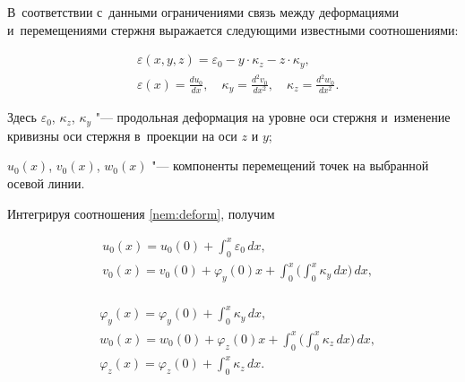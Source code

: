 В~соответствии с~данными ограничениями связь между деформациями и~перемещениями стержня выражается следующими известными соотношениями:

\begin{equation}\label{nem:deform}

\begin{aligned}

&\varepsilon(x,y,z)=\varepsilon_0-y\cdot\kappa_z-z\cdot\kappa_y,\\

&\varepsilon(x)=\frac{du_0}{dx},\quad \kappa_y=\frac{d^2v_0}{dx^2}, \quad \kappa_z=\frac{d^2w_0}{dx^2}.

\end{aligned}

\end{equation}

Здесь $\varepsilon_0$, $\kappa_z$, $\kappa_y$ "---  продольная деформация на уровне оси стержня и~изменение кривизны оси стержня в~проекции на оси $z$ и $y$; 

$u_0(x)$, $v_0(x)$, $w_0(x)$ "---  компоненты перемещений точек на выбранной осевой линии. 

Интегрируя соотношения \eqref{nem:deform}, получим

\begin{equation}

\begin{aligned}

&u_0(x)=u_0(0)+\int _0^x \varepsilon_0\,dx,\\

&v_0(x)=v_0(0)+\varphi_y(0) x+\int _0^x\biggl(\int _0^x \kappa_y\,dx\biggr)\,dx,\\

\end{aligned}

\end{equation}

\begin{equation}

\begin{aligned}

& \varphi_y(x)=\varphi_y(0)+\int _0^x \kappa_y\,dx,\\

&w_0(x)=w_0(0)+\varphi_z(0) x+\int _0^x\biggl(\int _0^x \kappa_z\,dx\biggr)\,dx,\\

& \varphi_z{}(x)=\varphi_z(0)+\int_0^x \kappa_z\,dx.

\end{aligned}

\label{nem:deformint}

\end{equation}

